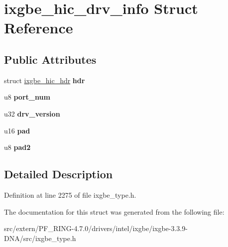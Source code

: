 \hypertarget{structixgbe__hic__drv__info}{
\section{ixgbe\_\-hic\_\-drv\_\-info Struct Reference}
\label{structixgbe__hic__drv__info}
}
\subsection*{Public Attributes}
\begin{DoxyCompactItemize}
\item 
\hypertarget{structixgbe__hic__drv__info_a8acf6482ff51244b9372d61c7b4cf5d8}{
struct \hyperlink{structixgbe__hic__hdr}{ixgbe\_\-hic\_\-hdr} {\bfseries hdr}}
\label{structixgbe__hic__drv__info_a8acf6482ff51244b9372d61c7b4cf5d8}

\item 
\hypertarget{structixgbe__hic__drv__info_ae2de9f8ace8b7b27dc3658210d388534}{
u8 {\bfseries port\_\-num}}
\label{structixgbe__hic__drv__info_ae2de9f8ace8b7b27dc3658210d388534}

\item 
\hypertarget{structixgbe__hic__drv__info_aa048e93277d501dad90af53f563496b8}{
u32 {\bfseries drv\_\-version}}
\label{structixgbe__hic__drv__info_aa048e93277d501dad90af53f563496b8}

\item 
\hypertarget{structixgbe__hic__drv__info_a182d0316363ce65f358b28a3ab9f8156}{
u16 {\bfseries pad}}
\label{structixgbe__hic__drv__info_a182d0316363ce65f358b28a3ab9f8156}

\item 
\hypertarget{structixgbe__hic__drv__info_a476337445ba2152bbcb1488ee163993d}{
u8 {\bfseries pad2}}
\label{structixgbe__hic__drv__info_a476337445ba2152bbcb1488ee163993d}

\end{DoxyCompactItemize}


\subsection{Detailed Description}


Definition at line 2275 of file ixgbe\_\-type.h.



The documentation for this struct was generated from the following file:\begin{DoxyCompactItemize}
\item 
src/extern/PF\_\-RING-\/4.7.0/drivers/intel/ixgbe/ixgbe-\/3.3.9-\/DNA/src/ixgbe\_\-type.h\end{DoxyCompactItemize}

